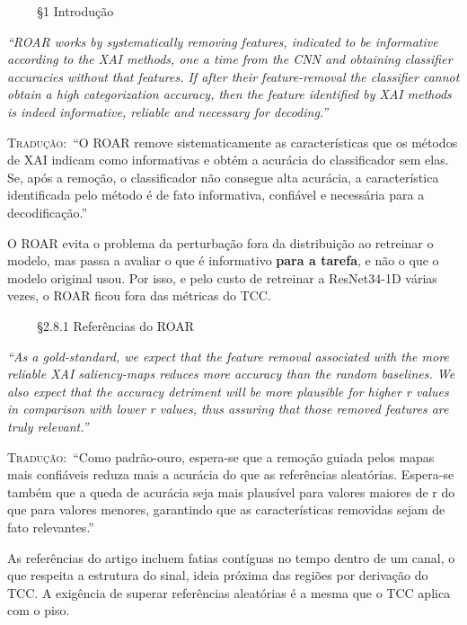 \documentclass[11pt,a4paper]{article}
\newcommand{\pagechip}[1]{{\setlength{\fboxsep}{1.5pt}\colorbox{cAcc}{\textcolor{white}{\scriptsize\texttt{#1}}}}}
\newenvironment{origquote}{\par\itshape\small}{\par}
\newenvironment{tradquote}{\par\small\textsc{Tradução:}\ }{\par}
\newcommand{\explab}[1]{\par\smallskip{\small\color{cAcc}\textbf{\MakeUppercase{#1}}}\par}
\begin{document}
\begin{citacard}{\pagechip{p. 2} §1 Introdução}
\begin{origquote}“ROAR works by systematically removing features, indicated to be informative according to the XAI methods, one a time from the CNN and obtaining classifier accuracies without that features. If after their feature-removal the classifier cannot obtain a high categorization accuracy, then the feature identified by XAI methods is indeed informative, reliable and necessary for decoding.”\end{origquote}
\begin{tradquote}“O ROAR remove sistematicamente as características que os métodos de XAI indicam como informativas e obtém a acurácia do classificador sem elas. Se, após a remoção, o classificador não consegue alta acurácia, a característica identificada pelo método é de fato informativa, confiável e necessária para a decodificação.”\end{tradquote}
\explab{Explicação}
O ROAR evita o problema da perturbação fora da distribuição ao retreinar o modelo, mas passa a avaliar o que é informativo \textbf{para a tarefa}, e não o que o modelo original usou. Por isso, e pelo custo de retreinar a ResNet34-1D várias vezes, o ROAR ficou fora das métricas do TCC.
\end{citacard}

\begin{citacard}{\pagechip{p. 7} §2.8.1 Referências do ROAR}
\begin{origquote}“As a gold-standard, we expect that the feature removal associated with the more reliable XAI saliency-maps reduces more accuracy than the random baselines. We also expect that the accuracy detriment will be more plausible for higher r values in comparison with lower r values, thus assuring that those removed features are truly relevant.”\end{origquote}
\begin{tradquote}“Como padrão-ouro, espera-se que a remoção guiada pelos mapas mais confiáveis reduza mais a acurácia do que as referências aleatórias. Espera-se também que a queda de acurácia seja mais plausível para valores maiores de r do que para valores menores, garantindo que as características removidas sejam de fato relevantes.”\end{tradquote}
\explab{Explicação}
As referências do artigo incluem fatias contíguas no tempo dentro de um canal, o que respeita a estrutura do sinal, ideia próxima das regiões por derivação do TCC. A exigência de superar referências aleatórias é a mesma que o TCC aplica com o piso.
\end{citacard}
\end{document}
